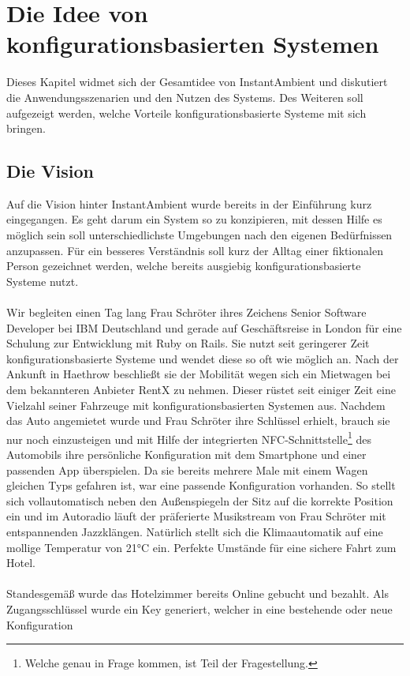\chapter{Die Idee von konfigurationsbasierten Systemen}

Dieses Kapitel widmet sich der Gesamtidee von InstantAmbient und diskutiert die Anwendungsszenarien und den Nutzen des Systems. Des Weiteren soll aufgezeigt werden, welche 
Vorteile konfigurationsbasierte Systeme mit sich bringen. 

\section{Die Vision}
Auf die Vision hinter InstantAmbient wurde bereits in der Einführung kurz eingegangen. Es geht darum ein System so zu konzipieren, mit dessen Hilfe es möglich sein soll 
unterschiedlichste Umgebungen nach den eigenen Bedürfnissen anzupassen. Für ein besseres Verständnis soll kurz der Alltag einer fiktionalen Person gezeichnet werden, welche
bereits ausgiebig konfigurationsbasierte Systeme nutzt. 
\\\\
Wir begleiten einen Tag lang Frau Schröter ihres Zeichens Senior Software Developer bei IBM Deutschland und gerade auf Geschäftsreise in London für eine Schulung zur 
Entwicklung mit Ruby on Rails. Sie nutzt seit geringerer Zeit konfigurationsbasierte Systeme und wendet diese so oft wie möglich an. Nach der Ankunft in Haethrow beschließt 
sie der Mobilität wegen sich ein Mietwagen bei dem bekannteren Anbieter RentX zu nehmen. Dieser rüstet seit einiger Zeit eine Vielzahl seiner Fahrzeuge mit 
konfigurationsbasierten Systemen aus. Nachdem das Auto angemietet wurde und Frau Schröter ihre Schlüssel erhielt, brauch sie nur noch einzusteigen und mit Hilfe der 
integrierten NFC-Schnittstelle\footnote{Welche genau in Frage kommen, ist Teil der Fragestellung.} des Automobils ihre persönliche Konfiguration mit dem Smartphone und einer 
passenden App überspielen. Da sie bereits mehrere Male mit einem Wagen gleichen Typs gefahren ist, war eine passende Konfiguration vorhanden. So stellt sich vollautomatisch
neben den Außenspiegeln der Sitz auf die korrekte Position ein und im Autoradio läuft der präferierte Musikstream von Frau Schröter mit entspannenden Jazzklängen. Natürlich
stellt sich die Klimaautomatik auf eine mollige Temperatur von 21°C ein. Perfekte Umstände für eine sichere Fahrt zum Hotel.
\\\\
Standesgemäß wurde das Hotelzimmer bereits Online gebucht und bezahlt. Als Zugangsschlüssel wurde ein Key generiert, welcher in eine bestehende oder neue Konfiguration 
